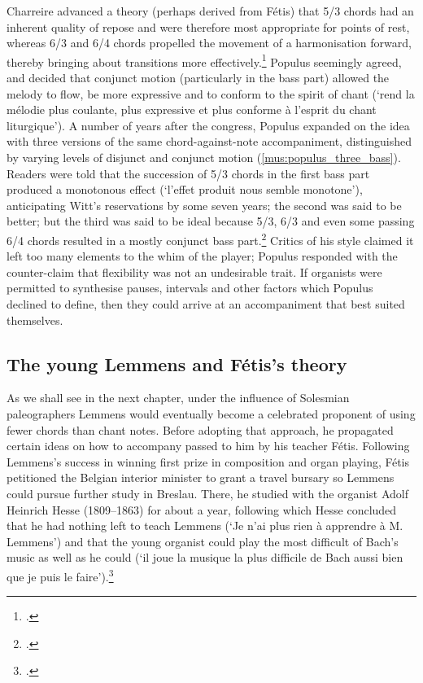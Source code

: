 Charreire advanced a theory (perhaps derived from Fétis) that 5/3 chords had an inherent quality of repose and were therefore most appropriate for points of rest, whereas 6/3 and 6/4 chords propelled the movement of a harmonisation forward, thereby bringing about transitions more effectively.\footcite[41]{Congrespourrestauration1862}
Populus seemingly agreed, and decided that conjunct motion (particularly in the bass part) allowed the melody to flow, be more expressive and to conform to the spirit of chant (`rend la mélodie plus coulante, plus expressive et plus conforme à l'esprit du chant liturgique').
%
A number of years after the congress, Populus expanded on the idea with three versions of the same chord-against-note accompaniment, distinguished by varying levels of disjunct and conjunct motion (\cref{mus:populus_three_bass}).
Readers were told that the succession of 5/3 chords in the first bass part produced a monotonous effect (`l'effet produit nous semble monotone'), anticipating Witt's reservations by some seven years; the second was said to be better; but the third was said to be ideal because 5/3, 6/3 and even some passing 6/4 chords resulted in a mostly conjunct bass part.\footcite[part I: pp. 10, 15--16; part II: p. 2]{PopulusEtudesorgue1863}
Critics of his style claimed it left too many elements to the whim of the player; Populus responded with the counter-claim that flexibility was not an undesirable trait.
If organists were permitted to synthesise pauses, intervals and other factors which Populus declined to define, then they could arrive at an accompaniment that best suited themselves.
%

\subsection{The young Lemmens and Fétis's theory}
\label{sc:lemmens}%
As we shall see in the next chapter, under the influence of Solesmian paleographers Lemmens would eventually become a celebrated proponent of using fewer chords than chant notes.
Before adopting that approach, he propagated certain ideas on how to accompany passed to him by his teacher Fétis.
Following Lemmens's success in winning first prize in composition and organ playing, Fétis petitioned the Belgian interior minister to grant a travel bursary so Lemmens could pursue further study in Breslau.
There, he studied with the organist Adolf Heinrich Hesse (1809--1863) for about a year, following which Hesse concluded that he had nothing left to teach Lemmens (`Je n'ai plus rien à apprendre à M. Lemmens') and that the young organist could play the most difficult of Bach's music as well as he could (`il joue la musique la plus difficile de Bach aussi bien que je puis le faire').\footcite[267]{FetisBiographieuniversellemusiciens1867b}

